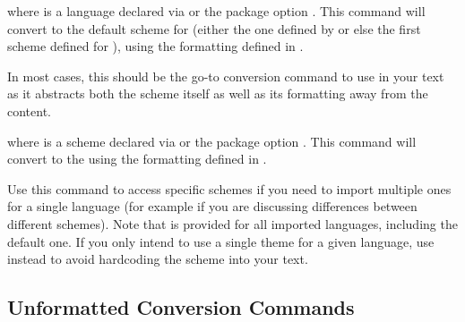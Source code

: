 \documentclass{ltxdockit}
\begin{document}
\begin{ltxsyntax}

  where  is a language declared via
   or the package option .
  This command will convert  to the default scheme for 
  (either the one defined by  or else the first scheme
  defined for ), using the formatting defined in
  .

  In most cases, this should be the go-to conversion command to use in your text
  as it abstracts both the scheme itself as well as its formatting away from the
  content.


  where  is a scheme declared via
   or the package option .
  This command will convert  to the  using the formatting
  defined in .

  Use this command to access specific schemes if you need to import multiple
  ones for a single language (for example if you are discussing differences
  between different schemes). Note that  is
  provided for all imported languages, including the default one. If you only
  intend to use a single theme for a given language, use
   instead to avoid hardcoding the scheme into your
  text.

\end{ltxsyntax}

\subsection{Unformatted Conversion Commands}
\end{document}
